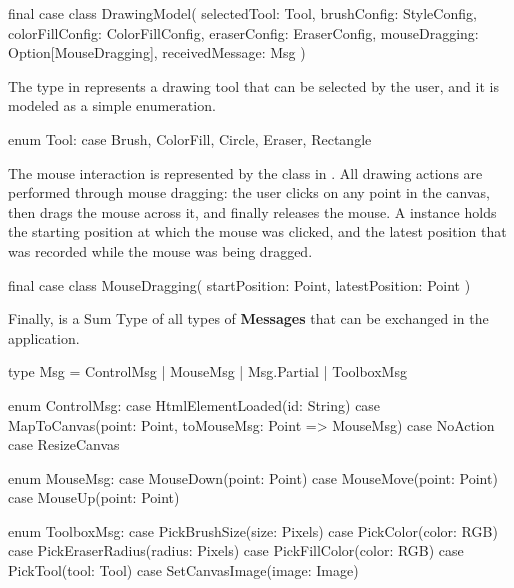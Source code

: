 \begin{scala}[label=lst:bellevue-model, caption=Bellevue Model]
final case class DrawingModel(
    selectedTool: Tool,
    brushConfig: StyleConfig,
    colorFillConfig: ColorFillConfig,
    eraserConfig: EraserConfig,
    mouseDragging: Option[MouseDragging],
    receivedMessage: Msg
)
\end{scala}

The  type in  represents a drawing tool that can be selected by the 
user, and it is modeled as a simple enumeration.

\begin{scala}[label=lst:bellevue-tool, caption=Bellevue drawing tools]
enum Tool:
  case Brush, ColorFill, Circle, Eraser, Rectangle
\end{scala}

The mouse interaction is represented by the  class in 
. All drawing actions are performed through mouse dragging: the 
user clicks on any point in the canvas, then drags the mouse across it, and finally releases the mouse.
A  instance holds the starting position at which the mouse was clicked, and the
latest position that was recorded while the mouse was being dragged.

\begin{scala}[label=lst:bellevue-mouse-dragging, caption=Bellevue mouse dragging modelling]
final case class MouseDragging(
    startPosition: Point,
    latestPosition: Point
)
\end{scala}

Finally,  is a Sum Type of all types of \textbf{Messages} that can be exchanged in the 
application.

\begin{scala}[label=lst:bellevue-msg]
type Msg = ControlMsg | MouseMsg | Msg.Partial | ToolboxMsg

enum ControlMsg:
  case HtmlElementLoaded(id: String)
  case MapToCanvas(point: Point, toMouseMsg: Point => MouseMsg)
  case NoAction
  case ResizeCanvas

enum MouseMsg:
  case MouseDown(point: Point)
  case MouseMove(point: Point)
  case MouseUp(point: Point)

enum ToolboxMsg:
  case PickBrushSize(size: Pixels)
  case PickColor(color: RGB)
  case PickEraserRadius(radius: Pixels)
  case PickFillColor(color: RGB)
  case PickTool(tool: Tool)
  case SetCanvasImage(image: Image)
\end{scala}

